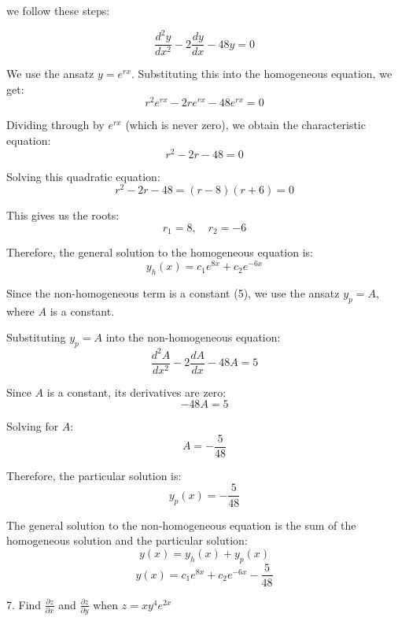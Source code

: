 \documentclass[a4paper, 12pt]{report}
\def\ni{green!60!black!40!white}
\begin{document}
        we follow these steps:
        
        \[ \frac{d^2 y}{dx^2} - 2 \frac{dy}{dx} - 48y = 0 \]
        
        We use the ansatz \( y = e^{rx} \). Substituting this into the homogeneous equation, we get:
        \[ r^2 e^{rx} - 2r e^{rx} - 48 e^{rx} = 0 \]
        
        Dividing through by \( e^{rx} \) (which is never zero), we obtain the characteristic equation:
        \[ r^2 - 2r - 48 = 0 \]
        
        Solving this quadratic equation:
        \[ r^2 - 2r - 48 = (r - 8)(r + 6) = 0 \]
        
        This gives us the roots:
        \[ r_1 = 8, \quad r_2 = -6 \]
        
        Therefore, the general solution to the homogeneous equation is:
        \[ y_h(x) = c_1 e^{8x} + c_2 e^{-6x} \]
        
        Since the non-homogeneous term is a constant (5), we use the ansatz \( y_p = A \), where \( A \) is a constant.
        
        Substituting \( y_p = A \) into the non-homogeneous equation:
        \[ \frac{d^2 A}{dx^2} - 2 \frac{dA}{dx} - 48A = 5 \]
        
        Since \( A \) is a constant, its derivatives are zero:
        \[ -48A = 5 \]
        
        Solving for \( A \):
        \[ A = -\frac{5}{48} \]
        
        Therefore, the particular solution is:
        \[ y_p(x) = -\frac{5}{48} \]
        
        The general solution to the non-homogeneous equation is the sum of the homogeneous solution and the particular solution:
        \[ y(x) = y_h(x) + y_p(x) \]
        \[ y(x) = c_1 e^{8x} + c_2 e^{-6x} - \frac{5}{48} \]    
    \newpage
    
    \begin{tcolorbox}[title={\color{black}\section{Q7}}, colback=white, colframe=\ni, boxrule=1mm, width=1\textwidth]
        7. Find \( \frac{\partial z}{\partial x} \) and \( \frac{\partial z}{\partial y} \) when \( z = x y^4 e^{2x} \)
    \end{tcolorbox}
    
\end{document}
